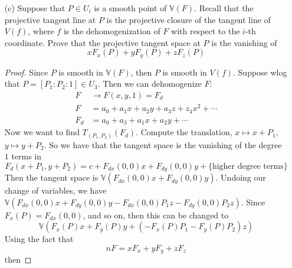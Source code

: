 \documentclass{article}
\begin{document}
\begin{itemize}
        \item [(c)] Suppose that $P \in U_{i}$ is a smooth point of $\mathbb{V}(F)$. Recall that the projective tangent line at $P$ is the projective closure of the tangent line of $V(f)$, where $f$ is the dehomogenization of $F$ with respect to the $i$-th coordinate. Prove that the projective tangent space at $P$ is the vanishing of 
            \begin{equation*}
                xF_{x}(P) + yF_{y}(P) + zF_{z}(P)
            \end{equation*}
                \begin{proof}
                    Since $P$ is smooth in $\mathbb{V}(F)$, then $P$ is smooth in $V(f)$. Suppose wlog that $P = [P_{1} : P_{2} : 1] \in U_{3}$. Then we can dehomogenize $F$:
                        \begin{align*}
                            F &\rightarrow F(x, y, 1) = F_{d} \\
                            F &= a_{0} + a_{1}x + a_{2}y + a_{3}z + z_{4}x^{2} + \cdots \\
                            F_{d} &= a_{0} + a_{3} + a_{1}x + a_{2}y + \cdots
                        \end{align*}
                    Now we want to find $T_{(P_{1}, P_{2})}(F_{d})$. Compute the translation, $x \mapsto x + P_{1}$, $y \mapsto y + P_{2}$. So we have that the tangent space is the vanishing of the degree $1$ terms in 
                        \begin{equation*}
                            F_{d}(x + P_{1}, y + P_{2}) = c + F_{dx}(0, 0)x + F_{dy}(0, 0)y + \{\text{higher degree terms}\}
                        \end{equation*}
                    Then the tangent space is $\mathbb{V}(F_{dx}(0, 0)x + F_{dy}(0, 0)y)$. Undoing our change of variables, we have $\mathbb{V}(F_{dx}(0, 0)x + F_{dy}(0, 0)y - F_{dx}(0, 0)P_{1}z - F_{dy}(0, 0)P_{2}z)$. Since $F_{x}(P) = F_{dx}(0, 0)$, and so on, then this can be changed to 
                        \begin{equation*}
                            \mathbb{V}(F_{x}(P)x + F_{y}(P)y + (- F_{x}(P)P_{1} - F_{y}(P)P_{2})z)
                        \end{equation*}
                    Using the fact that
                        \begin{equation*}
                            nF = xF_{x} + yF_{y} + zF_{z}
                        \end{equation*}
                    then

\end{proof}
\end{itemize}
\end{document}
